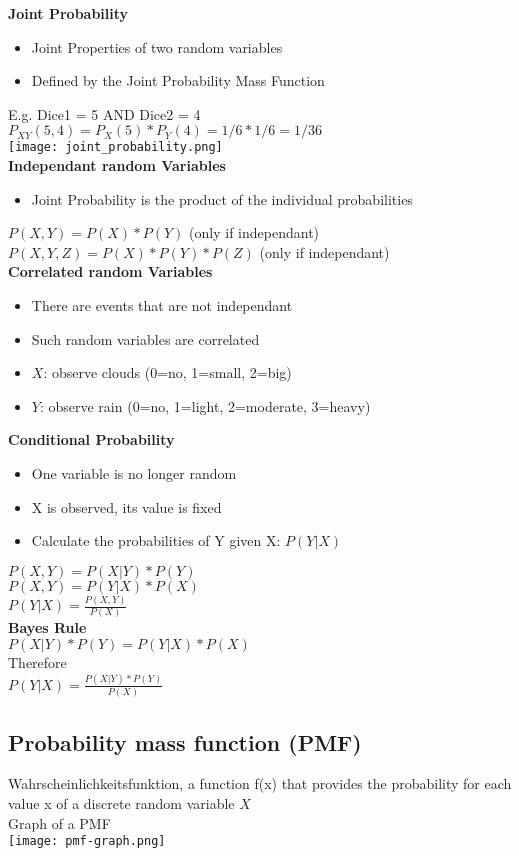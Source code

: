 \textbf{Joint Probability}
\begin{itemize}
    \item Joint Properties of two random variables
    \item Defined by the Joint Probability Mass Function
\end{itemize}
E.g. Dice1 = 5 AND Dice2 = 4\\
$P_{XY}(5,4) = P_X(5) * P_Y(4) = 1/6 * 1/6 = 1/36$\\
\texttt{[image: joint\_probability.png]} \\
\textbf{Independant random Variables}
\begin{itemize}
    \item Joint Probability is the product of the individual probabilities
\end{itemize}
$P(X,Y) = P(X) * P(Y)$ (only if independant)\\
$P(X,Y,Z) = P(X) * P(Y) * P(Z)$ (only if independant)\\
\textbf{Correlated random Variables}
\begin{itemize}
    \item There are events that are not independant
    \item Such random variables are correlated
    \item $X$: observe clouds (0=no, 1=small, 2=big)
    \item $Y$: observe rain (0=no, 1=light, 2=moderate, 3=heavy)
\end{itemize}
\textbf{Conditional Probability}
\begin{itemize}
    \item One variable is no longer random
    \item X is observed, its value is fixed
    \item Calculate the probabilities of Y given X: $P(Y | X)$
\end{itemize}
$P(X, Y) = P(X | Y) * P(Y)$\\
$P(X, Y) = P(Y | X) * P(X)$\\
$P(Y | X) = \frac{P(X,Y)}{P(X)}$\\
\textbf{Bayes Rule}\\
$P(X|Y)*P(Y) = P(Y|X)*P(X)$\\
Therefore\\
$P(Y|X) = \frac{P(X|Y)*P(Y)}{P(X)}$


\subsection{Probability mass function (PMF)}
Wahrscheinlichkeitsfunktion, a function f(x) that provides the probability for each value x of a discrete random
variable $X$ \\

Graph of a PMF \\
\texttt{[image: pmf-graph.png]} \\
